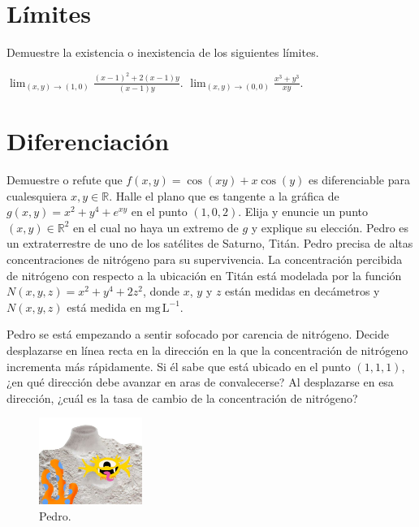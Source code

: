 \documentclass{fmbvecto}
\begin{document}
\section{Límites}

Demuestre la existencia o inexistencia de los siguientes límites.

\begin{enumerate}
    \setcounter{enumi}{4}
    \itemp[\(0.\bar{3}\)] \(\displaystyle \lim_{(x, y) \to (1, 0)} \frac{(x-1)^2+2(x-1)y}{(x-1)y}\).
    \itemp[\(0.\bar{3}\)] \(\displaystyle  \lim_{(x, y) \to (0, 0)} \frac{x^3+y^3}{xy}.\)
\end{enumerate}

\section{Diferenciación}

\begin{enumerate}
    \setcounter{enumi}{6}
    \itemp[\(0.\bar{3}\)] Demuestre o refute que \(f(x, y) = \cos(xy) +x\cos(y)\) es diferenciable para cualesquiera \(x, y \in \mathbb{R}\).
    \itemp[\(0.\bar{3}\)] Halle el plano que es tangente a la gráfica de \(g(x, y) = x^2+y^4+e^{xy}\) en el punto \((1, 0, 2)\). Elija y enuncie un punto \((x, y) \in \mathbb{R}^2\) en el cual no haya un extremo de \(g\) y explique su elección.
    \itemp[\(0.\bar{3}\)] Pedro es un extraterrestre de uno de los satélites de Saturno, Titán. Pedro precisa de altas concentraciones de nitrógeno para su supervivencia. La concentración percibida de nitrógeno con respecto a la ubicación en Titán está modelada por la función \(N(x, y, z) = x^2+y^4+2z^2\), donde \(x\), \(y\) y \(z\) están medidas en decámetros y \(N(x, y, z)\) está medida en \(\mathrm{mg} \, \mathrm{L}^{-1}\). 
    
    Pedro se está empezando a sentir sofocado por carencia de nitrógeno. Decide desplazarse en línea recta en la dirección en la que la concentración de nitrógeno incrementa más rápidamente. Si él sabe que está ubicado en el punto \((1, 1, 1)\), ¿en qué dirección debe avanzar en aras de convalecerse? Al desplazarse en esa dirección, ¿cuál es la tasa de cambio de la concentración de nitrógeno?
    \begin{figure}[H]
        \centering
        \includegraphics[width=0.3\textwidth]{marciano.png}
        \caption{Pedro.}
    \end{figure}
\end{enumerate}
\end{document}
